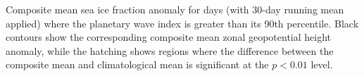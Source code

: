 \label{fig:sic_composite}
Composite mean sea ice fraction anomaly for days (with 30-day running mean applied) where the planetary wave index is greater than its 90th percentile. Black contours show the corresponding composite mean zonal geopotential height anomaly, while the hatching shows regions where the difference between the composite mean and climatological mean is significant at the $p < 0.01$ level.